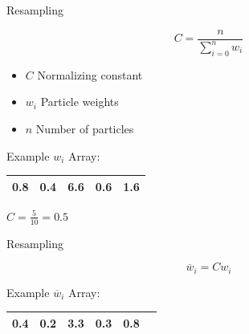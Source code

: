 \documentclass{beamer}
\begin{document}


\begin{frame}{Resampling}

\begin{equation}\label{resample1}
C = \frac{n}{\sum_{i=0}^{n} w_{i}}
\end{equation}

\vspace{0.5cm}

\begin{itemize}
\item \(C\) Normalizing constant
\item \(w_{i}\) Particle weights
\item \(n\) Number of particles
\end{itemize}

\vspace{0.5cm}

\begin{center}
Example \(w_{i}\) Array:
\end{center}

\renewcommand{\tabcolsep}{0.5cm}
\begin{center}
\begin{tabular}{ | c | c | c | c | c | }
  \hline
   0.8 & 0.4 & 6.6 & 0.6 & 1.6 \\
  \hline
\end{tabular}
\end{center}

\begin{center}
\(C = \frac{5}{10} = 0.5 \)
\end{center}

\end{frame}



\begin{frame}{Resampling}

\begin{equation}\label{resample2}
\overline{w}_{i}=C w_{i}
\end{equation}

\vspace{0.5cm}

\begin{center}
Example \(\overline{w}_{i}\) Array:
\end{center}

\renewcommand{\tabcolsep}{0.5cm}
\begin{center}
\begin{tabular}{ | c | c | c | c | c | c | }
  \hline
   0.4 & 0.2 & 3.3 & 0.3 & 0.8 \\
  \hline
\end{tabular}
\end{center}

\end{frame}
\end{document}
